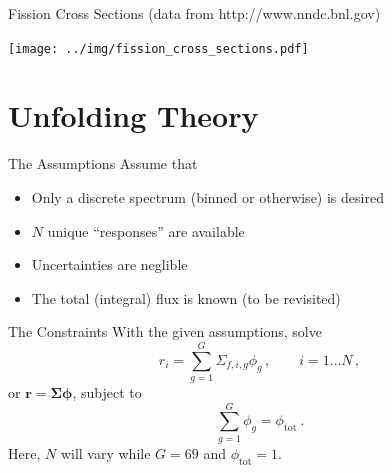 \documentclass[fleqn]{beamer}
\begin{document}
    
    \begin{frame}{Fission Cross Sections (data from http://www.nndc.bnl.gov)}
         \begin{center}
             \texttt{[image: ../img/fission\_cross\_sections.pdf]}
         \end{center}
    \end{frame}
    
    
    \section{Unfolding Theory}
    
    \begin{frame}{The Assumptions}
      Assume that 
      \begin{itemize}
       \item Only a discrete spectrum (binned or otherwise) is desired
       \item $N$ unique ``responses'' are available
       \item Uncertainties are neglible
       \item The total (integral) flux is known (to be revisited)
      \end{itemize}
    \end{frame}  
    
    
    \begin{frame}{The Constraints}
      With the given assumptions, solve
      \begin{equation}
            r_i = \sum_{g=1}^{G} \Sigma_{f,i,g}  \phi_g\, , 
              \qquad i = 1 \ldots N \, ,
          \label{eq:response}
      \end{equation}     
      or $\mathbf{r} = \bm{\Sigma} \bm{\phi}$, subject to 
      \begin{equation}
            \sum^G_{g=1}{\phi_g} = \phi_{\textrm{tot}} \ .
      \end{equation}
      Here, $N$ will vary while $G = 69$ and $\phi_{\textrm{tot}} = 1$.
    \end{frame}
\end{document}
